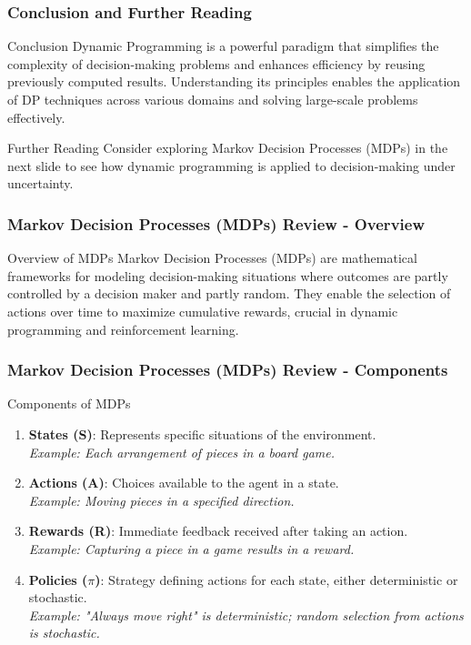 \documentclass[aspectratio=169]{beamer}
\begin{document}
\begin{frame}[fragile]
    \frametitle{Conclusion and Further Reading}
    \begin{block}{Conclusion}
        Dynamic Programming is a powerful paradigm that simplifies the complexity of decision-making problems and enhances efficiency by reusing previously computed results. 
        Understanding its principles enables the application of DP techniques across various domains and solving large-scale problems effectively.
    \end{block}

    \begin{block}{Further Reading}
        Consider exploring Markov Decision Processes (MDPs) in the next slide to see how dynamic programming is applied to decision-making under uncertainty.
    \end{block}
\end{frame}

\begin{frame}[fragile]
    \frametitle{Markov Decision Processes (MDPs) Review - Overview}
    \begin{block}{Overview of MDPs}
        Markov Decision Processes (MDPs) are mathematical frameworks for modeling decision-making situations where outcomes are partly controlled by a decision maker and partly random. They enable the selection of actions over time to maximize cumulative rewards, crucial in dynamic programming and reinforcement learning.
    \end{block}
\end{frame}

\begin{frame}[fragile]
    \frametitle{Markov Decision Processes (MDPs) Review - Components}
    \begin{block}{Components of MDPs}
        \begin{enumerate}
            \item \textbf{States (S)}: Represents specific situations of the environment. \\
                  \emph{Example: Each arrangement of pieces in a board game.}
            
            \item \textbf{Actions (A)}: Choices available to the agent in a state. \\
                  \emph{Example: Moving pieces in a specified direction.}
            
            \item \textbf{Rewards (R)}: Immediate feedback received after taking an action. \\
                  \emph{Example: Capturing a piece in a game results in a reward.}
            
            \item \textbf{Policies ($\pi$)}: Strategy defining actions for each state, either deterministic or stochastic. \\
                  \emph{Example: "Always move right" is deterministic; random selection from actions is stochastic.}
        \end{enumerate}
    \end{block}
\end{frame}
\end{document}
